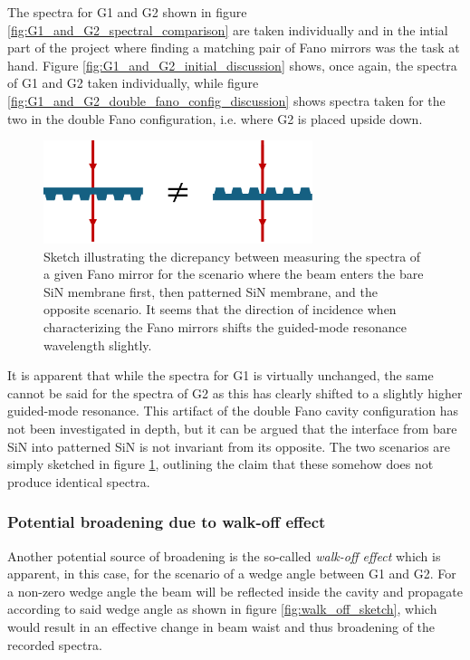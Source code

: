 The spectra for G1 and G2 shown in figure \ref{fig:G1_and_G2_spectral_comparison} are taken individually and in the intial part of the project where finding a matching pair of Fano mirrors was the task at hand. Figure \ref{fig:G1_and_G2_initial_discussion} shows, once again, the spectra of G1 and G2 taken individually, while figure \ref{fig:G1_and_G2_double_fano_config_discussion} shows spectra taken for the two in the double Fano configuration, i.e. where G2 is placed upside down. 

\begin{figure}[h!]
    \centering
    \includegraphics[width=0.7\textwidth]{figures/upside_down_membrane_sketch.pdf}
    \caption{Sketch illustrating the dicrepancy between measuring the spectra of a given Fano mirror for the scenario where the beam enters the bare SiN membrane first, then patterned SiN membrane, and the opposite scenario. It seems that the direction of incidence when characterizing the Fano mirrors shifts the guided-mode resonance wavelength slightly.}
    \label{fig:upside_down_membrane_sketch}
\end{figure}

It is apparent that while the spectra for G1 is virtually unchanged, the same cannot be said for the spectra of G2 as this has clearly shifted to a slightly higher guided-mode resonance. This artifact of the double Fano cavity configuration has not been investigated in depth, but it can be argued that the interface from bare SiN into patterned SiN is not invariant from its opposite. The two scenarios are simply sketched in figure \ref{fig:upside_down_membrane_sketch}, outlining the claim that these somehow does not produce identical spectra.

\subsubsection{Potential broadening due to walk-off effect}

Another potential source of broadening is the so-called \emph{walk-off effect} which is apparent, in this case, for the scenario of a wedge angle between G1 and G2. For a non-zero wedge angle the beam will be reflected inside the cavity and propagate according to said wedge angle as shown in figure \ref{fig:walk_off_sketch}, which would result in an effective change in beam waist and thus broadening of the recorded spectra.

